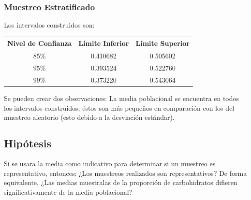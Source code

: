 \documentclass[12pt,a4paper]{article}
\begin{document}
    \subsubsection{Muestreo Estratificado}
        Los intervalos construidos son:
        \begin{center}
            \begin{tabular}{|c|c|c|}
                \hline
                Nivel de Confianza & Límite Inferior & Límite Superior \\
                \hline
                $85\%$ & 0.410682 & 0.505602 \\
                $95\%$ & 0.393524 & 0.522760 \\
                $99\%$ & 0.373220 & 0.543064 \\
                \hline
                \end{tabular}
        \end{center}
        Se pueden crear dos observaciones: La media 
        poblacional se encuentra en todos los intervalos 
        construidos; éstos son más pequeños en comparación 
        con los del muestreo aleatorio (esto debido a la 
        desviación estándar).

    \subsection{Hipótesis}
        Si se usara la media como indicativo para determinar 
        si un muestreo es representativo, entonces: ¿Los muestreos 
        realizados son representativos? De forma equivalente, ¿Las 
        medias muestralas de la proporción de carbohidratos difieren 
        significativamente de la media poblacional?
        
\newpage

\printbibliography[heading=bibintoc,title={Referencias Bibliográficas}]
\end{document}
